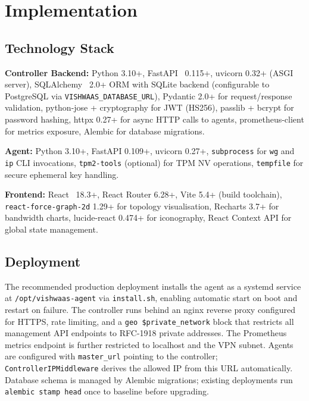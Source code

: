 \documentclass[conference]{IEEEtran}
\begin{document}
\FloatBarrier
\section{Implementation}
\label{sec:implementation}

\subsection{Technology Stack}

\textbf{Controller Backend:} Python 3.10+, FastAPI~\cite{fastapi} 0.115+,
uvicorn 0.32+ (ASGI server), SQLAlchemy~\cite{sqlalchemy} 2.0+ ORM with SQLite
backend (configurable to PostgreSQL via \texttt{VISHWAAS\_DATABASE\_URL}),
Pydantic 2.0+ for request/response validation, python-jose + cryptography for JWT
(HS256), passlib + bcrypt for password hashing, httpx 0.27+ for async HTTP calls
to agents, prometheus-client for metrics exposure, Alembic for database
migrations.

\textbf{Agent:} Python 3.10+, FastAPI 0.109+, uvicorn 0.27+, \texttt{subprocess}
for \texttt{wg} and \texttt{ip} CLI invocations, \texttt{tpm2-tools} (optional)
for TPM NV operations, \texttt{tempfile} for secure ephemeral key handling.

\textbf{Frontend:} React~\cite{react} 18.3+, React Router 6.28+, Vite 5.4+
(build toolchain), \texttt{react-force-graph-2d} 1.29+ for topology
visualisation, Recharts 3.7+ for bandwidth charts, lucide-react 0.474+ for
iconography, React Context API for global state management.

\subsection{Deployment}

The recommended production deployment installs the agent as a systemd service at
\texttt{/opt/vishwaas-agent} via \texttt{install.sh}, enabling automatic start on
boot and restart on failure. The controller runs behind an nginx reverse proxy
configured for HTTPS, rate limiting, and a \texttt{geo \$private\_network} block
that restricts all management API endpoints to RFC-1918 private addresses. The
Prometheus metrics endpoint is further restricted to localhost and the VPN subnet.
Agents are configured with \texttt{master\_url} pointing to the controller;
\texttt{ControllerIPMiddleware} derives the allowed IP from this URL automatically.
Database schema is managed by Alembic migrations; existing deployments run
\texttt{alembic stamp head} once to baseline before upgrading.
\end{document}

